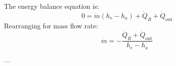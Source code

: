 The energy balance equation is:  
\[
0 = \dot{m}(h_e - h_a) + \dot{Q}_R + \dot{Q}_{\text{out}}
\]  
Rearranging for mass flow rate:  
\[
\dot{m} = -\frac{\dot{Q}_R + \dot{Q}_{\text{out}}}{h_e - h_a}
\]  

---